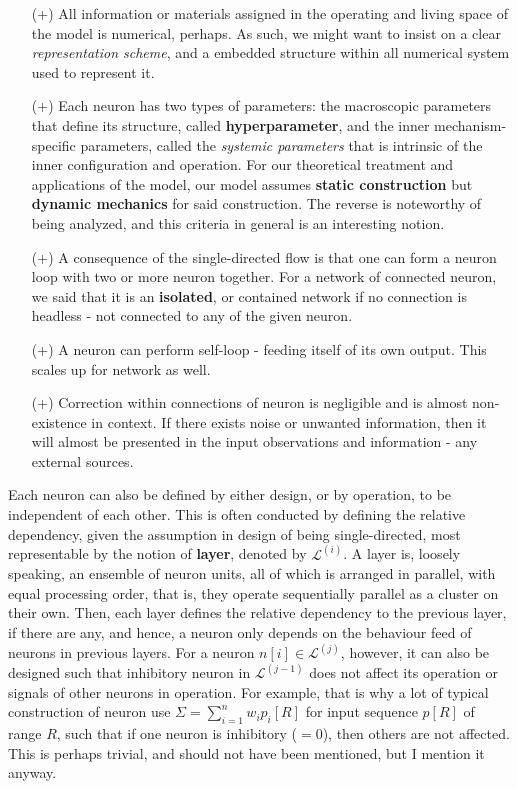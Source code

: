 \begin{itemize}[itemsep=1pt, topsep=3pt,leftmargin=4pt]
    \item[(+)] All information or materials assigned in the operating and living space of the model is numerical, perhaps. As such, we might want to insist on a clear \textit{representation scheme}, and a embedded structure within all numerical system used to represent it. 
    \item[(+)] Each neuron has two types of parameters: the macroscopic parameters that define its structure, called \textbf{hyperparameter}, and the inner mechanism-specific parameters, called the \textit{systemic parameters} that is intrinsic of the inner configuration and operation. For our theoretical treatment and applications of the model, our model assumes \textbf{static construction} but \textbf{dynamic mechanics} for said construction. The reverse is noteworthy of being analyzed, and this criteria in general is an interesting notion. 
    \item[(+)] A consequence of the single-directed flow is that one can form a neuron loop with two or more neuron together. For a network of connected neuron, we said that it is an \textbf{isolated}, or contained network if no connection is headless - not connected to any of the given neuron. 
    \item[(+)] A neuron can perform self-loop - feeding itself of its own output. This scales up for network as well.  
    \item[(+)] Correction within connections of neuron is negligible and is almost non-existence in context. If there exists noise or unwanted information, then it will almost be presented in the input observations and information - any external sources. 
\end{itemize}

Each neuron can also be defined by either design, or by operation, to be independent of each other. This is often conducted by defining the relative dependency, given the assumption in design of being single-directed, most representable by the notion of \textbf{layer}, denoted by $\mathcal{L}^{(i)}$. A layer is, loosely speaking, an ensemble of neuron units, all of which is arranged in parallel, with equal processing order, that is, they operate sequentially parallel as a cluster on their own. Then, each layer defines the relative dependency to the previous layer, if there are any, and hence, a neuron only depends on the behaviour feed of neurons in previous layers. For a neuron $n[i]\in \mathcal{L}^{(j)}$, however, it can also be designed such that inhibitory neuron in $\mathcal{L}^{(j-1)}$ does not affect its operation or signals of other neurons in operation. For example, that is why a lot of typical construction of neuron use $\Sigma = \sum_{i=1}^{n} w_{i}p_{i}[R]$ for input sequence $p[R]$ of range $R$, such that if one neuron is inhibitory ($=0$), then others are not affected. This is perhaps trivial, and should not have been mentioned, but I mention it anyway. 


